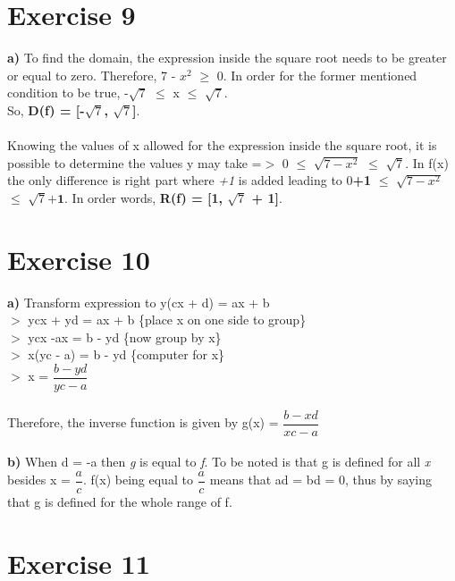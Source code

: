 \documentclass{article}
\begin{document}
  \section*{Exercise 9}
  \textbf{a)} To find the domain, the expression inside the square root needs to be greater or equal to zero. Therefore, 7 - $x^2$ $\geq$ 0. In order for the former mentioned condition to be true, -$\sqrt{7}$ $\leq$ x $\leq$ $\sqrt{7}$. \\
  So, \textbf{D(f) = [-$\sqrt{7}$, $\sqrt{7}$]}. \\ \\ 
  Knowing the values of x allowed for the expression inside the square root, it is possible to determine the values y may take =$>$ 0 $\leq$ $\sqrt{7 - x^2}$ $\leq$ $\sqrt{7}$. In f(x) the only difference is right part where \textit{+1} is added leading to 0\textbf{+1} $\leq$ $\sqrt{7 - x^2}$ $\leq$ $\sqrt{7} \textbf{+1}$. In order words, \textbf{R(f) = [1, $\sqrt{7}$ + 1]}.
  
  \section*{Exercise 10}
  \textbf{a)} Transform expression to y(cx + d) = ax + b \\
  $>$ ycx + yd = ax + b \{place x on one side to group\} \\ 
  $>$ ycx -ax = b - yd  \{now group by x\} \\
  $>$ x(yc - a) = b - yd \{computer for x\} \\
  $>$ x = $\dfrac{b-yd}{yc-a}$ \\ \\
  Therefore, the inverse function is given by g(x) = $\dfrac{b-xd}{xc-a}$ \\ \\
  \textbf{b)} When d = -a then \textit{g} is equal to \textit{f}. To be noted is that g is defined for all \textit{x} besides x = $\dfrac{a}{c}$. f(x) being equal to $\dfrac{a}{c}$ means that ad = bd = 0, thus by saying that g is defined for the whole range of f.
   
  
  \section*{Exercise 11}
  
\end{document}
